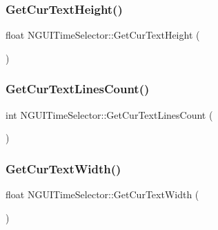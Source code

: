 \hypertarget{class_n_g_u_i_time_selector_a93417636d5e7ca1c6f429015d2d503c8}{}\label{class_n_g_u_i_time_selector_a93417636d5e7ca1c6f429015d2d503c8} 
\subsubsection{\texorpdfstring{Get\+Cur\+Text\+Height()}{GetCurTextHeight()}}
{\footnotesize\ttfamily float N\+G\+U\+I\+Time\+Selector\+::\+Get\+Cur\+Text\+Height (\begin{DoxyParamCaption}{ }\end{DoxyParamCaption})}

\hypertarget{class_n_g_u_i_time_selector_af0779b34992b718e120c781eb18699c2}{}\label{class_n_g_u_i_time_selector_af0779b34992b718e120c781eb18699c2} 
\subsubsection{\texorpdfstring{Get\+Cur\+Text\+Lines\+Count()}{GetCurTextLinesCount()}}
{\footnotesize\ttfamily int N\+G\+U\+I\+Time\+Selector\+::\+Get\+Cur\+Text\+Lines\+Count (\begin{DoxyParamCaption}{ }\end{DoxyParamCaption})}

\hypertarget{class_n_g_u_i_time_selector_ac8b515ce7726923f41c0f1db289fd2dd}{}\label{class_n_g_u_i_time_selector_ac8b515ce7726923f41c0f1db289fd2dd} 
\subsubsection{\texorpdfstring{Get\+Cur\+Text\+Width()}{GetCurTextWidth()}}
{\footnotesize\ttfamily float N\+G\+U\+I\+Time\+Selector\+::\+Get\+Cur\+Text\+Width (\begin{DoxyParamCaption}{ }\end{DoxyParamCaption})}

